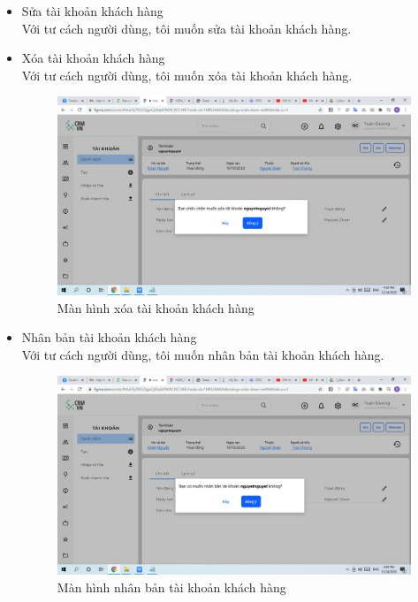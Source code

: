 \documentclass[12pt,a4paper]{article}
\begin{document}
\begin{enumerate}
\begin{itemize}
            \item Sửa tài khoản khách hàng \\
            Với tư cách người dùng, tôi muốn sửa tài khoản khách hàng.

            \item Xóa tài khoản khách hàng \\
            Với tư cách người dùng, tôi muốn xóa tài khoản khách hàng.

            \begin{figure}[H]
                \centering \includegraphics[width=\textwidth]{Img/Nguyet/TaikhoanKH/xoa.png}
                \vspace{0.5cm}
                \caption{Màn hình xóa tài khoản khách hàng }
                \label{xoatkkh}
            \end{figure}

            \item Nhân bản tài khoản khách hàng \\
            Với tư cách người dùng, tôi muốn nhân bản tài khoản khách hàng.

            \begin{figure}[H]
                \centering \includegraphics[width=\textwidth]{Img/Nguyet/TaikhoanKH/nhanban.png}
                \vspace{0.5cm}
                \caption{Màn hình nhân bản tài khoản khách hàng }
                \label{nbtkkh}
            \end{figure}


\end{itemize}
\end{enumerate}
\end{document}
